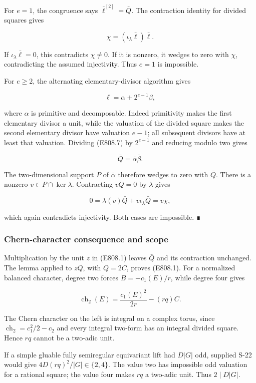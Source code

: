 For \(e=1\), the congruence says \(\bar\ell^{[2]}=\bar Q\). The
contraction identity for divided squares gives

\[
 \chi=(\iota_\lambda\bar\ell)\bar\ell.
\]

If \(\iota_\lambda\bar\ell=0\), this contradicts \(\chi\ne0\). If it is
nonzero, it wedges to zero with \(\chi\), contradicting the assumed
injectivity. Thus \(e=1\) is impossible.

For \(e\ge2\), the alternating elementary-divisor algorithm gives

\[
 \ell=\alpha+2^{e-1}\beta,
\]

where \(\alpha\) is primitive and decomposable. Indeed primitivity makes
the first elementary divisor a unit, while the valuation of the divided
square makes the second elementary divisor have valuation \(e-1\); all
subsequent divisors have at least that valuation. Dividing (E808.7) by
\(2^{e-1}\) and reducing modulo two gives

\[
 \bar Q=\bar\alpha\bar\beta.
\]

The two-dimensional support \(P\) of \(\bar\alpha\) therefore wedges to
zero with \(\bar Q\). There is a nonzero \(v\in P\cap\ker\lambda\).
Contracting \(v\bar Q=0\) by \(\lambda\) gives

\[
 0=\lambda(v)\bar Q+v\iota_\lambda\bar Q=v\chi,
\]

which again contradicts injectivity. Both cases are impossible. ∎

\subsubsection{Chern-character consequence and
scope}\label{chern-character-consequence-and-scope}

Multiplication by the unit \(z\) in (E808.1) leaves \(\bar Q\) and its
contraction unchanged. The lemma applied to \(zQ\), with \(Q=2C\),
proves (E808.1). For a normalized balanced character, degree two forces
\(B=-c_1(E)/r\), while degree four gives

\[
 \operatorname{ch}_2(E)=\frac{c_1(E)^2}{2r}-(rq)C.
\]

The Chern character on the left is integral on a complex torus, since
\(\operatorname{ch}_2=c_1^2/2-c_2\) and every integral two-form has an
integral divided square. Hence \(rq\) cannot be a two-adic unit.

If a simple gluable fully semiregular equivariant lift had \(D|G|\) odd,
supplied S-22 would give \(4D(rq)^2/|G|\in\{2,4\}\). The value two has
impossible odd valuation for a rational square; the value four makes
\(rq\) a two-adic unit. Thus \(2\mid D|G|\).

